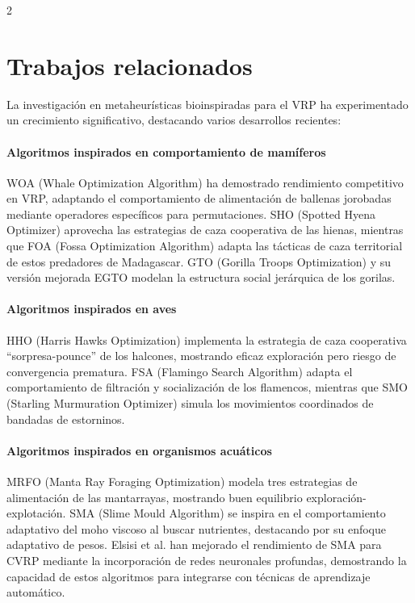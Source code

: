 \documentclass[10pt,a4paper]{extarticle}
\begin{document}
\begin{multicols}{2}
\section{Trabajos relacionados}
La investigación en metaheurísticas bioinspiradas para el VRP ha experimentado un crecimiento significativo, destacando varios desarrollos recientes:

\paragraph{Algoritmos inspirados en comportamiento de mamíferos} WOA (Whale Optimization Algorithm) \cite{Mirjalili2016WOA} ha demostrado rendimiento competitivo en VRP, adaptando el comportamiento de alimentación de ballenas jorobadas mediante operadores específicos para permutaciones. SHO (Spotted Hyena Optimizer) \cite{Mirjalili2017SHO} aprovecha las estrategias de caza cooperativa de las hienas, mientras que FOA (Fossa Optimization Algorithm) \cite{Hamadneh2024FOA} adapta las tácticas de caza territorial de estos predadores de Madagascar. GTO (Gorilla Troops Optimization) \cite{Abdollahzadeh2021GTO} y su versión mejorada EGTO \cite{Hassan2024EGTO} modelan la estructura social jerárquica de los gorilas.

\paragraph{Algoritmos inspirados en aves} HHO (Harris Hawks Optimization) \cite{Heidari2019HHO} implementa la estrategia de caza cooperativa ``sorpresa-pounce'' de los halcones, mostrando eficaz exploración pero riesgo de convergencia prematura. FSA (Flamingo Search Algorithm) \cite{Wang2021FSA} adapta el comportamiento de filtración y socialización de los flamencos, mientras que SMO (Starling Murmuration Optimizer) \cite{Zamani2022SMO} simula los movimientos coordinados de bandadas de estorninos.

\paragraph{Algoritmos inspirados en organismos acuáticos} MRFO (Manta Ray Foraging Optimization) \cite{Zhao2020MRFO} modela tres estrategias de alimentación de las mantarrayas, mostrando buen equilibrio exploración-explotación. SMA (Slime Mould Algorithm) \cite{Li2020SMA} se inspira en el comportamiento adaptativo del moho viscoso al buscar nutrientes, destacando por su enfoque adaptativo de pesos. Elsisi et al. \cite{Elsisi2023DNN} han mejorado el rendimiento de SMA para CVRP mediante la incorporación de redes neuronales profundas, demostrando la capacidad de estos algoritmos para integrarse con técnicas de aprendizaje automático.


\end{multicols}
\end{document}

